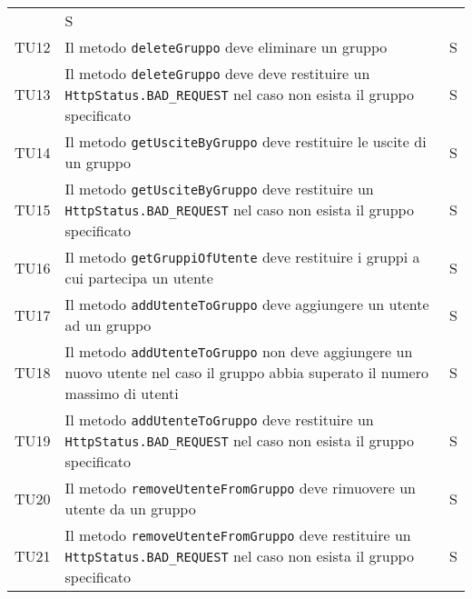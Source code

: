 \begin{center}
{\begin{longtable}{
      |>{\centering\arraybackslash}p{48pt}
      |>{\centering\arraybackslash}p{308pt}
      |>{\centering\arraybackslash}p{27pt}|}
                  & S                                              \\
      TU12
                  & Il metodo \texttt{deleteGruppo}
      deve eliminare un gruppo
                  & S                                              \\
      TU13
                  & Il metodo \texttt{deleteGruppo}
      deve deve restituire un \texttt{ HttpStatus.BAD\_REQUEST} nel caso non
      esista
      il gruppo specificato
                  & S                                              \\
      TU14
                  & Il metodo
      \texttt{getUsciteByGruppo} deve restituire le uscite di un gruppo
                  & S                                              \\
      TU15
                  & Il metodo
      \texttt{getUsciteByGruppo} deve restituire un \texttt{
        HttpStatus.BAD\_REQUEST}
      nel caso non esista il gruppo specificato
                  & S                                              \\
      TU16
                  & Il metodo
      \texttt{getGruppiOfUtente} deve restituire i gruppi a cui partecipa un
      utente
                  & S                                              \\
      TU17
                  & Il metodo
      \texttt{addUtenteToGruppo} deve aggiungere un utente ad un gruppo
                  & S                                              \\
      TU18
                  & Il metodo
      \texttt{addUtenteToGruppo} non deve aggiungere un nuovo utente nel caso
      il
      gruppo abbia superato il numero massimo di utenti
                  & S                                              \\
      TU19
                  & Il metodo
      \texttt{addUtenteToGruppo} deve restituire un \texttt{
        HttpStatus.BAD\_REQUEST}
      nel caso non esista il gruppo specificato
                  & S                                              \\
      TU20
                  & Il metodo
      \texttt{removeUtenteFromGruppo} deve rimuovere un utente da un gruppo
                  & S                                              \\
      TU21
                  & Il metodo
      \texttt{removeUtenteFromGruppo} deve restituire un \texttt{
        HttpStatus.BAD\_REQUEST} nel caso non esista il gruppo specificato
                  & S                                              \\

\end{longtable}}
\end{center}
